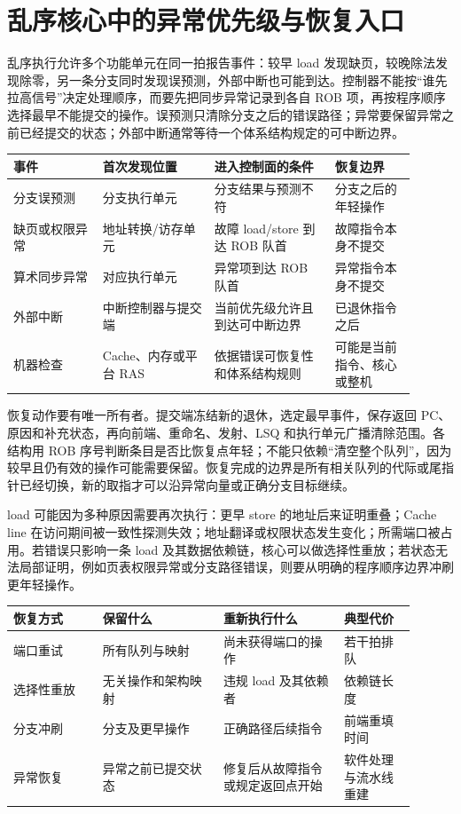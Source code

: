 \section{乱序核心中的异常优先级与恢复入口}

乱序执行允许多个功能单元在同一拍报告事件：较早 load 发现缺页，较晚除法发现除零，另一条分支同时发现误预测，外部中断也可能到达。控制器不能按“谁先拉高信号”决定处理顺序，而要先把同步异常记录到各自 ROB 项，再按程序顺序选择最早不能提交的操作。误预测只清除分支之后的错误路径；异常要保留异常之前已经提交的状态；外部中断通常等待一个体系结构规定的可中断边界。

\begin{longtable}{L{0.20\linewidth}L{0.25\linewidth}L{0.27\linewidth}L{0.18\linewidth}}
\toprule
事件 & 首次发现位置 & 进入控制面的条件 & 恢复边界 \\
\midrule
分支误预测 & 分支执行单元 & 分支结果与预测不符 & 分支之后的年轻操作 \\
缺页或权限异常 & 地址转换/访存单元 & 故障 load/store 到达 ROB 队首 & 故障指令本身不提交 \\
算术同步异常 & 对应执行单元 & 异常项到达 ROB 队首 & 异常指令本身不提交 \\
外部中断 & 中断控制器与提交端 & 当前优先级允许且到达可中断边界 & 已退休指令之后 \\
机器检查 & Cache、内存或平台 RAS & 依据错误可恢复性和体系结构规则 & 可能是当前指令、核心或整机 \\
\bottomrule
\end{longtable}

恢复动作要有唯一所有者。提交端冻结新的退休，选定最早事件，保存返回 PC、原因和补充状态，再向前端、重命名、发射、LSQ 和执行单元广播清除范围。各结构用 ROB 序号判断条目是否比恢复点年轻；不能只依赖“清空整个队列”，因为较早且仍有效的操作可能需要保留。恢复完成的边界是所有相关队列的代际或尾指针已经切换，新的取指才可以沿异常向量或正确分支目标继续。


load 可能因为多种原因需要再次执行：更早 store 的地址后来证明重叠；Cache line 在访问期间被一致性探测失效；地址翻译或权限状态发生变化；所需端口被占用。若错误只影响一条 load 及其数据依赖链，核心可以做选择性重放；若状态无法局部证明，例如页表权限异常或分支路径错误，则要从明确的程序顺序边界冲刷更年轻操作。

\begin{longtable}{L{0.20\linewidth}L{0.27\linewidth}L{0.27\linewidth}L{0.16\linewidth}}
\toprule
恢复方式 & 保留什么 & 重新执行什么 & 典型代价 \\
\midrule
端口重试 & 所有队列与映射 & 尚未获得端口的操作 & 若干拍排队 \\
选择性重放 & 无关操作和架构映射 & 违规 load 及其依赖者 & 依赖链长度 \\
分支冲刷 & 分支及更早操作 & 正确路径后续指令 & 前端重填时间 \\
异常恢复 & 异常之前已提交状态 & 修复后从故障指令或规定返回点开始 & 软件处理与流水线重建 \\
\bottomrule
\end{longtable}

